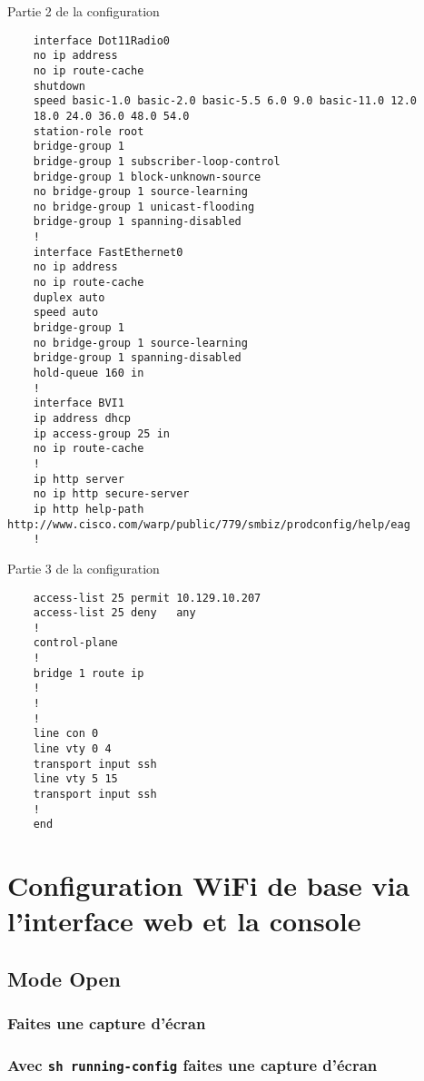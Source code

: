 \documentclass[12pt, a4paper]{article}
\begin{document}
    \begin{listing}[H]
        \caption{Partie 2 de la configuration }
        \label{lst:conf2}
        \begin{verbatim}
    interface Dot11Radio0
    no ip address
    no ip route-cache
    shutdown
    speed basic-1.0 basic-2.0 basic-5.5 6.0 9.0 basic-11.0 12.0 
    18.0 24.0 36.0 48.0 54.0
    station-role root
    bridge-group 1
    bridge-group 1 subscriber-loop-control
    bridge-group 1 block-unknown-source
    no bridge-group 1 source-learning
    no bridge-group 1 unicast-flooding
    bridge-group 1 spanning-disabled
    !
    interface FastEthernet0
    no ip address
    no ip route-cache
    duplex auto
    speed auto
    bridge-group 1
    no bridge-group 1 source-learning
    bridge-group 1 spanning-disabled
    hold-queue 160 in
    !
    interface BVI1
    ip address dhcp
    ip access-group 25 in
    no ip route-cache
    !
    ip http server
    no ip http secure-server
    ip http help-path http://www.cisco.com/warp/public/779/smbiz/prodconfig/help/eag
    !
        \end{verbatim}
    \end{listing}

    \begin{listing}[H]
        \caption{Partie 3 de la configuration }
        \label{lst:conf3}
        \begin{verbatim}
    access-list 25 permit 10.129.10.207
    access-list 25 deny   any
    !
    control-plane
    !
    bridge 1 route ip
    !
    !
    !         
    line con 0
    line vty 0 4
    transport input ssh
    line vty 5 15
    transport input ssh
    !
    end
        \end{verbatim}
    \end{listing}


\section{Configuration WiFi de base via l'interface web et la console}
    \subsection{Mode Open}
        \subsubsection{Faites une capture d'écran}

        \subsubsection{Avec \texttt{sh running-config} faites une capture d'écran}
\end{document}
